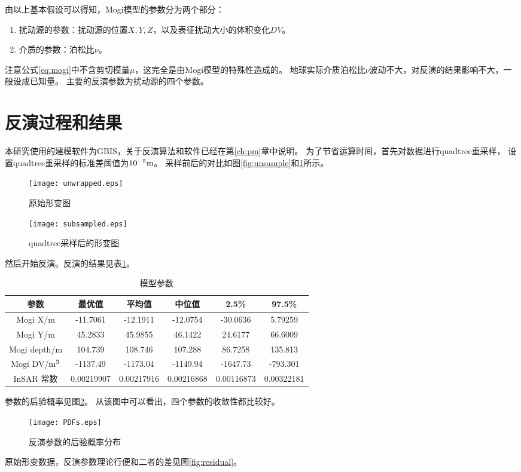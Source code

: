 由以上基本假设可以得知，Mogi模型的参数分为两个部分：
\begin{enumerate}
    \item 扰动源的参数：扰动源的位置$X,Y,Z$，以及表征扰动大小的体积变化$DV$。
    \item 介质的参数：泊松比$\nu$。
\end{enumerate}
注意公式\ref{eq:mogi}中不含剪切模量$\mu$，这完全是由Mogi模型的特殊性造成的。
地球实际介质泊松比$\nu$波动不大，对反演的结果影响不大，一般设成已知量。
主要的反演参数为扰动源的四个参数。

\section{反演过程和结果}
本研究使用的建模软件为GBIS，关于反演算法和软件已经在第\ref{ch:pm}章中说明。
为了节省运算时间，首先对数据进行quadtree重采样，
设置quadtree重采样的标准差阈值为$\rm 10^{-5}m$。
采样前后的对比如图\ref{fig:unsample}和\ref{fig:subsample}所示。
\begin{figure}[htp]
    \centering
    \begin{minipage}{0.85\textwidth}
        \centering
        \texttt{[image: unwrapped.eps]}
        \caption{原始形变图}
        \label{fig:unsample}
    \end{minipage}
    \qquad
    \begin{minipage}{0.85\textwidth}
        \centering
        \texttt{[image: subsampled.eps]}
        \caption{quadtree采样后的形变图}
        \label{fig:subsample}
    \end{minipage}
\end{figure}
然后开始反演。反演的结果见表\ref{tab:modelpar}。
\begin{table}[htb]
    \centering\small
    \caption{模型参数}
    \label{tab:modelpar}
    \begin{tabular}{@{}cccccc@{}}
    \toprule
    参数       & 最优值 & 平均值 & 中位值 & 2.5\% & 97.5\% \\ 
    \midrule
    Mogi X/m    & -11.7061 & -12.1911 & -12.0754 & -30.0636 & 5.79259\\
    Mogi Y/m     & 45.2833 & 45.9855 & 46.1422 & 24.6177 & 66.6009\\
    Mogi depth/m & 104.739 & 108.746 & 107.288 & 86.7258 & 135.813\\
    Mogi DV/$\rm m^3$   & -1137.49 & -1173.04 & -1149.94 & -1647.73 & -793.301\\
    InSAR 常数 & 0.00219907	& 0.00217916 & 0.00216868 & 0.00116873 & 0.00322181\\
    \bottomrule
    \end{tabular}
\end{table}
参数的后验概率见图\ref{fig:pdf}。
从该图中可以看出，四个参数的收敛性都比较好。
\begin{figure}[htb]
    \centering
    \texttt{[image: PDFs.eps]}
    \caption{反演参数的后验概率分布}
    \label{fig:pdf}
\end{figure}
原始形变数据，反演参数理论行便和二者的差见图\ref{fig:residual}。

